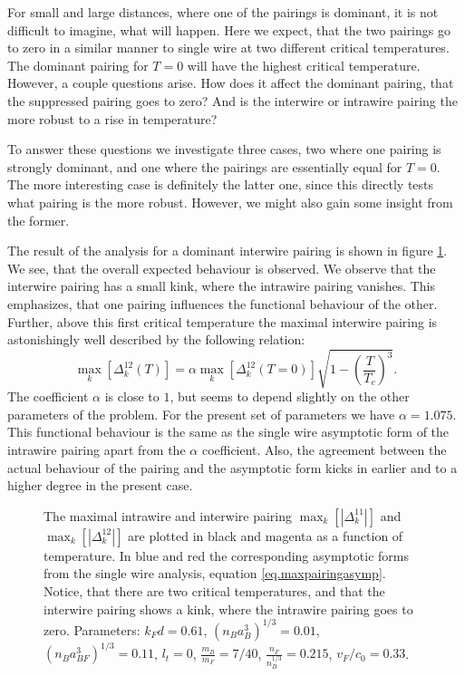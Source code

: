 For small and large distances, where one of the pairings is dominant, it is not difficult to imagine, what will happen. Here we expect, that the two pairings go to zero in a similar manner to single wire at two different critical temperatures. The dominant pairing for $T = 0$ will have the highest critical temperature. However, a couple questions arise. How does it affect the dominant pairing, that the suppressed pairing goes to zero? And is the interwire or intrawire pairing the more robust to a rise in temperature?

To answer these questions we investigate three cases, two where one pairing is strongly dominant, and one where the pairings are essentially equal for $T = 0$. The more interesting case is definitely the latter one, since this directly tests what pairing is the more robust. However, we might also gain some insight from the former. 

The result of the analysis for a dominant interwire pairing is shown in figure \ref{fig.maximalpairingsTdepend_2wires}. We see, that the overall expected behaviour is observed. We observe that the interwire pairing has a small kink, where the intrawire pairing vanishes. This emphasizes, that one pairing influences the functional behaviour of the other. Further, above this first critical temperature the maximal interwire pairing is astonishingly well described by the following relation:
\begin{equation}
\max_k[\Delta^{12}_k(T)] = \alpha \max_k[\Delta^{12}_k(T = 0)] \sqrt{1 - \left(\frac{T}{T_c}\right)^3}. 
\end{equation}
The coefficient $\alpha$ is close to $1$, but seems to depend slightly on the other parameters of the problem. For the present set of parameters we have $\alpha = 1.075$. This functional behaviour is the same as the single wire asymptotic form of the intrawire pairing apart from the $\alpha$ coefficient. Also, the agreement between the actual behaviour of the pairing and the asymptotic form kicks in earlier and to a higher degree in the present case. 

\begin{figure} 
\begin{center}  
  
\caption{The maximal intrawire and interwire pairing $\max_k[|\Delta^{11}_k|]$ and $\max_k[|\Delta^{12}_k|]$ are plotted in black and magenta as a function of temperature. In blue and red the corresponding asymptotic forms from the single wire analysis, equation \eqref{eq.maxpairingasymp}. Notice, that there are two critical temperatures, and that the interwire pairing shows a kink, where the intrawire pairing goes to zero. Parameters: $k_Fd = 0.61$, $(n_Ba_B^3)^{1/3} = 0.01$, $(n_Ba_{BF}^3)^{1/3} = 0.11$, $l_t = 0$, $\frac{m_B}{m_F} = 7/40$, $\frac{n_F}{n_B^{1/3}} = 0.215$, $v_F/c_0 = 0.33$.}  
\label{fig.maximalpairingsTdepend_2wires}  
\end{center}    
\end{figure} 



 


